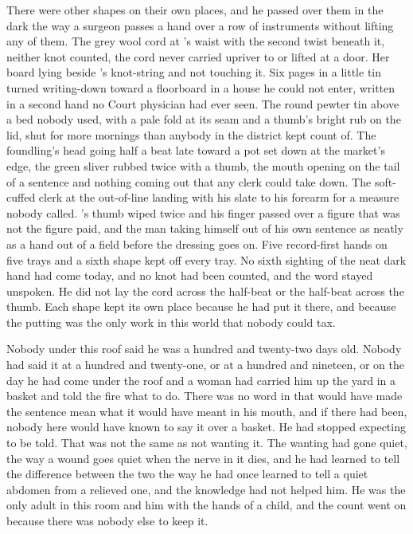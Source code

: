 There were other shapes on their own places, and he passed over them in the dark the way a surgeon passes a hand over a row of instruments without lifting any of them. The grey wool cord at 's waist with the second twist beneath it, neither knot counted, the cord never carried upriver to  or lifted at a door. Her board lying beside 's knot-string and not touching it. Six pages in a little tin turned writing-down toward a floorboard in a house he could not enter, written in a second hand no Court physician had ever seen. The round pewter tin above a bed nobody used, with a pale fold at its seam and a thumb's bright rub on the lid, shut for more mornings than anybody in the district kept count of. The foundling's head going half a beat late toward a pot set down at the market's edge, the green sliver rubbed twice with a thumb, the mouth opening on the tail of a sentence and nothing coming out that any clerk could take down. The soft-cuffed clerk at the out-of-line landing with his slate to his forearm for a measure nobody called. 's thumb wiped twice and his finger passed over a figure that was not the figure paid, and the man taking himself out of his own sentence as neatly as a hand out of a field before the dressing goes on. Five record-first hands on five trays and a sixth shape kept off every tray. No sixth sighting of the neat dark hand had come today, and no knot had been counted, and the word stayed unspoken. He did not lay the cord across the half-beat or the half-beat across the thumb. Each shape kept its own place because he had put it there, and because the putting was the only work in this world that nobody could tax.

\scenebreak

Nobody under this roof said he was a hundred and twenty-two days old. Nobody had said it at a hundred and twenty-one, or at a hundred and nineteen, or on the day he had come under the roof and a woman had carried him up the yard in a basket and told the fire what to do. There was no word in  that would have made the sentence mean what it would have meant in his mouth, and if there had been, nobody here would have known to say it over a basket. He had stopped expecting to be told. That was not the same as not wanting it. The wanting had gone quiet, the way a wound goes quiet when the nerve in it dies, and he had learned to tell the difference between the two the way he had once learned to tell a quiet abdomen from a relieved one, and the knowledge had not helped him. He was the only adult in this room and him with the hands of a child, and the count went on because there was nobody else to keep it.

